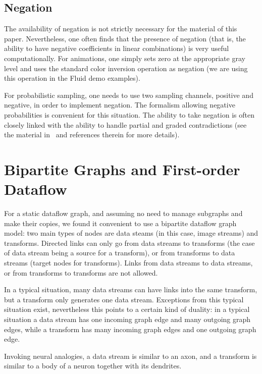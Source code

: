 \documentclass{llncs}
\begin{document}
\subsection{Negation}

The availability of negation is not strictly necessary for the material of this paper. Nevertheless, one often finds that the presence of negation
(that is, the ability to have negative coefficients in linear combinations) is very useful computationally.
For animations, one simply sets zero at the appropriate gray level and uses the standard color inversion operation as
negation (we are using this operation in the Fluid demo examples). 

For probabilistic sampling, one needs to use two sampling channels, positive and negative, in order to implement negation.
The formalism allowing negative probabilities is convenient for this situation. The ability to take negation is often
closely linked with the ability to handle partial and graded contradictions (see the material in~\cite{MBukatinMatthews} and
references therein for more details).

\section{Bipartite Graphs and First-order Dataflow}\label{first}

For a static dataflow graph, and assuming no need to manage subgraphs and make their copies, we found it
convenient to use a bipartite dataflow graph model: two main types of nodes are data steams (in this case,
image streams) and transforms. Directed links can only go from data streams to transforms (the case of data stream being a source for a transform),
or from transforms to data streams (target nodes for transforms). Links from data streams to data streams,
or from transforms to transforms are not allowed. 

In a typical situation, many data streams can have links into the same transform, but a transform only generates
one data stream. Exceptions from this typical situation exist, nevertheless this points to a certain kind of
duality: in a typical situation a data stream has one incoming graph edge and many outgoing graph edges,
while a transform has many incoming graph edges and one outgoing graph edge.

Invoking neural analogies, a data stream is similar to an axon, and a transform is similar to a body of a neuron together with its dendrites.
\end{document}
